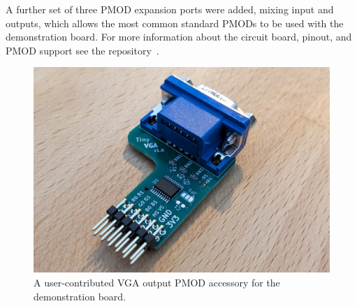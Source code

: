 A further set of three PMOD expansion ports were added, mixing input and outputs, which allows the most common standard PMODs to be used with the demonstration board. For more information about the circuit board, pinout, and PMOD support see the repository~\cite{tt04demoboard}.

\begin{figure}[!t]
\centering
\includegraphics[width=\columnwidth]{./Figs/tiny_vga_pmod.jpg}
\caption{A user-contributed VGA output PMOD accessory for the demonstration board.}
\label{fig:user_contributed_VGA_PMOD}
\end{figure}
